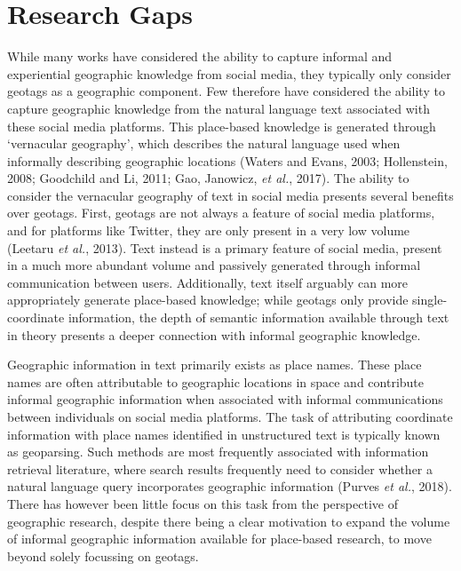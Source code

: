 \documentclass[
  letterpaper,
  11pt,
  english,
  onehalfspacing,
  headsepline]{MastersDoctoralThesis}
\begin{document}
\hypertarget{research-gaps}{%
\section{Research Gaps}\label{research-gaps}}

While many works have considered the ability to capture informal and
experiential geographic knowledge from social media, they typically only
consider geotags as a geographic component. Few therefore have
considered the ability to capture geographic knowledge from the natural
language text associated with these social media platforms. This
place-based knowledge is generated through `vernacular geography', which
describes the natural language used when informally describing
geographic locations (Waters and Evans, 2003; Hollenstein, 2008;
Goodchild and Li, 2011; Gao, Janowicz, \emph{et al.}, 2017). The ability
to consider the vernacular geography of text in social media presents
several benefits over geotags. First, geotags are not always a feature
of social media platforms, and for platforms like Twitter, they are only
present in a very low volume (Leetaru \emph{et al.}, 2013). Text instead
is a primary feature of social media, present in a much more abundant
volume and passively generated through informal communication between
users. Additionally, text itself arguably can more appropriately
generate place-based knowledge; while geotags only provide
single-coordinate information, the depth of semantic information
available through text in theory presents a deeper connection with
informal geographic knowledge.

Geographic information in text primarily exists as place names. These
place names are often attributable to geographic locations in space and
contribute informal geographic information when associated with informal
communications between individuals on social media platforms. The task
of attributing coordinate information with place names identified in
unstructured text is typically known as geoparsing. Such methods are
most frequently associated with information retrieval literature, where
search results frequently need to consider whether a natural language
query incorporates geographic information (Purves \emph{et al.}, 2018).
There has however been little focus on this task from the perspective of
geographic research, despite there being a clear motivation to expand
the volume of informal geographic information available for place-based
research, to move beyond solely focussing on geotags.
\end{document}
